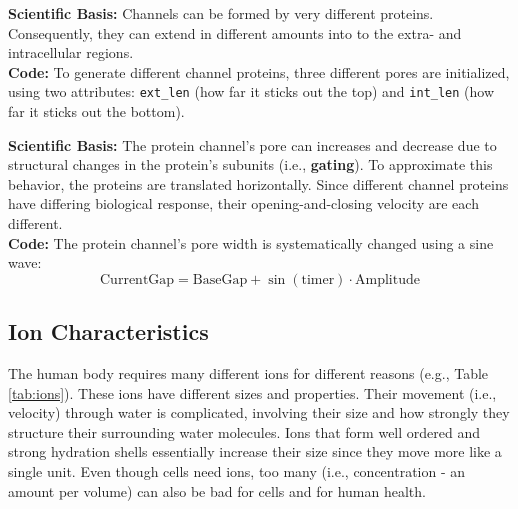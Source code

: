 \documentclass[11pt]{article}
\begin{document}
\begin{tcolorbox}[colback=gray!10, colframe=gray!50!black,title=Game Mechanic: Differing Protein]
	\textbf{Scientific Basis:} Channels can be formed by very different proteins. Consequently, they can extend in different amounts into to the extra- and intracellular regions.\\
	
	\textbf{Code:}
	To generate different channel proteins, three different pores are initialized, using two attributes: \texttt{ext\_len} (how far it sticks out the top) and \texttt{int\_len} (how far it sticks out the bottom).

\end{tcolorbox}

\begin{tcolorbox}[colback=gray!10, colframe=gray!50!black,title=Game Mechanic: Pore Opening and Closing]

	\textbf{Scientific Basis:} The protein channel's pore can increases and decrease due to structural changes in the protein's subunits (i.e., \textbf{gating}). To approximate this behavior, the proteins are translated horizontally. Since different channel proteins have differing biological response, their opening-and-closing velocity are each different.\\

	\textbf{Code:}
	The protein channel's pore width is systematically changed using a sine wave:
	\[ \text{CurrentGap} = \text{BaseGap} + \sin(\text{timer}) \cdot \text{Amplitude} \]

\end{tcolorbox}

\subsection{Ion Characteristics}

The human body requires many different ions for different reasons (e.g., Table \ref{tab:ions}). These ions have different sizes and properties. Their movement (i.e., velocity) through water is complicated, involving their size and how strongly they structure their surrounding water molecules. Ions that form well ordered and strong hydration shells essentially increase their size since they move more like a single unit. Even though cells need ions, too many (i.e., concentration - an amount per volume) can also be bad for cells and for human health.
\end{document}
